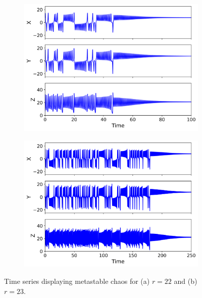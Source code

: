 \documentclass[paper=a4, fontsize=11pt]{scrartcl}
\numberwithin{equation}{section}		%
\numberwithin{figure}{section}			%
\numberwithin{table}{section}				%
\begin{document}
\begin{figure}[hbt!]
	\begin{subfigure}[b]{0.495\textwidth}
		\centering
		\includegraphics[width=\textwidth]{media/time_series_22.00.png}
		\caption{}
		\label{fig:sub1}
	\end{subfigure}
	\hfill
	\begin{subfigure}[b]{0.495\textwidth}
		\centering
		\includegraphics[width=\textwidth]{media/time_series_23.00.png}
		\caption{}
		\label{fig:sub2}
	\end{subfigure}
	
	\caption{Time series displaying metastable chaos for (a) $r = 22$ and (b) $r = 23$.}
	\label{fig:metastabletimeseries}
\end{figure}
\end{document}
